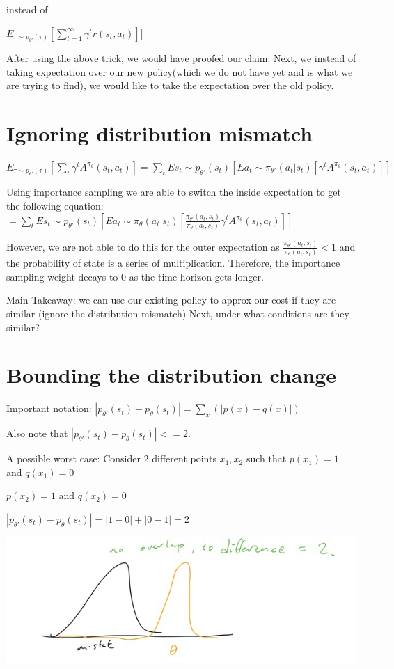 \documentclass{article}
\begin{document}
instead of 

$E_{{\tau}\sim p_{\theta'}(\tau)}[\sum_{t=1}^{\infty}\gamma^{t}r(s_t,a_t)]]$

After using the above trick, we would have proofed our claim. Next, we instead of taking expectation over our new policy(which we do not have yet and is what we are trying to find), we would like to take the expectation over the old policy.

\section{Ignoring distribution mismatch}

$E_{{\tau}\sim p_{\theta'}(\tau)}[\sum_{t}\gamma^{t}A^{\pi_\theta}(s_t,a_t)] = \sum_{t}E{s_t\sim p_{\theta'}(s_t)}[E{a_t\sim \pi_{\theta'}(a_t|s_t)}[\gamma^t A^{\pi_\theta}(s_t,a_t)]]$

Using importance sampling we are able to switch the inside expectation to get the following equation:
$= \sum_{t}E{s_t\sim p_{\theta'}(s_t)}[E{a_t\sim \pi_{\theta}(a_t|s_t)}[\frac{\pi_{\theta'}(a_t,s_t)}{\pi_{\theta}(a_t,s_t)}\gamma^t A^{\pi_\theta}(s_t,a_t)]]$

However, we are not able to do this for the outer expectation as
$\frac{\pi_{\theta'}(a_t,s_t)}{\pi_{\theta}(a_t,s_t)} < 1$ and the probability of state is a series of multiplication. Therefore, the importance sampling weight decays to 0 as the time horizon gets longer.

Main Takeaway: we can use our existing policy to approx our cost if they are similar (ignore the distribution mismatch)
Next, under what conditions are they similar?

\section{Bounding the distribution change}
Important notation: $|p_{\theta'}(s_t) - p_\theta(s_t)| = \sum_x(|p(x) - q(x)|)$

Also note that $|p_{\theta'}(s_t) - p_\theta(s_t)| <= 2$.

A possible worst case: Consider 2 different points $x_1, x_2$ such that
$p(x_1) = 1$ and $q(x_1) = 0$

$p(x_2) = 1$ and $q(x_2) = 0$

$|p_{\theta'}(s_t) - p_\theta(s_t)| = |1 - 0| + |0 - 1| = 2$

\includegraphics[scale=0.5]{bounding_dist2.jpg}
\end{document}
